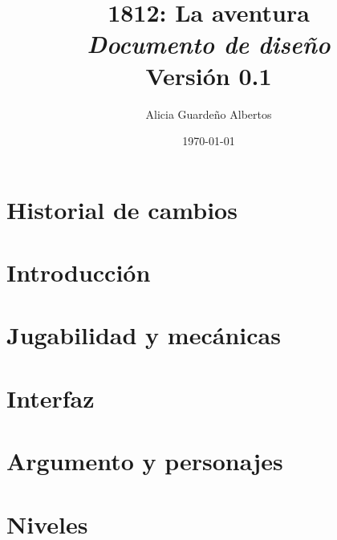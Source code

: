 \documentclass[a4paper,11pt,titlepage]{book}
\title{{\Huge \bf 1812: La aventura}\\{\large \em Documento de diseño}\\{\normalsize Versión 0.1}}
\author{Alicia Guardeño Albertos}
\date{\today}
\begin{document}
\renewcommand{\figurename}{Figura}
\renewcommand{\listfigurename}{Indice de figuras}
\renewcommand{\tablename}{Tabla}
\renewcommand{\listtablename}{Indice de tablas}

\vfill
\maketitle
\vfill
    \tableofcontents
    \listoffigures

\setlength{\parskip}{\baselineskip} %

\chapter{Historial de cambios}
\label{chap:historial}


\chapter{Introducción}%
\label{chap:introduccion}


\chapter{Jugabilidad y mecánicas}
\label{chap:jugabilidad}


\chapter{Interfaz}
\label{chap:interfaz}


\chapter{Argumento y personajes}%
\label{chap:argumento}


\chapter{Niveles}
\label{chap:niveles}

\end{document}
